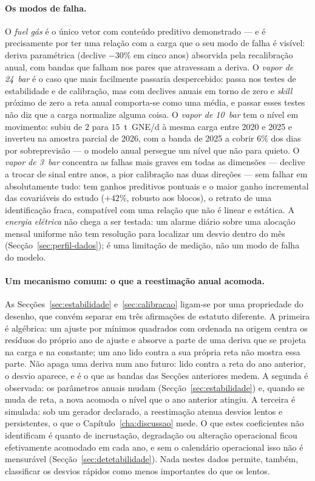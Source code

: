\paragraph{Os modos de falha.} O \emph{fuel gás} é o único vetor com
conteúdo preditivo demonstrado --- e é precisamente por ter uma relação com a
carga que o seu modo de falha é visível: deriva paramétrica (declive $-30\%$ em cinco anos)
absorvida pela recalibração anual, com bandas que falham nos pares que
atravessam a deriva. O \emph{vapor de 24~bar} é o caso que mais facilmente
passaria despercebido: passa nos testes de estabilidade e de calibração, mas
com declives anuais em torno de zero e \emph{skill} próximo de zero a reta
anual comporta-se como uma média, e passar esses testes não diz que a carga
normalize alguma coisa. O \emph{vapor de 10~bar} tem o nível em
movimento: subiu de $2$ para $15$~t~GNE/d à mesma carga entre 2020 e 2025 e
inverteu na amostra parcial de 2026, com a banda de 2025 a cobrir $6\%$ dos
dias por sobreprevisão --- o modelo anual persegue um nível que não para
quieto. O
\emph{vapor de 3~bar} concentra as falhas mais graves em todas as dimensões
--- declive a trocar de sinal entre anos, a pior calibração nas duas direções
--- sem falhar em absolutamente tudo: tem ganhos preditivos pontuais e o maior
ganho incremental das covariáveis do estudo ($+42\%$, robusto aos blocos), o retrato de uma
identificação fraca, compatível com uma relação que não é linear e estática.
A \emph{energia elétrica} não chega a ser testada: um alarme diário sobre uma
alocação mensal uniforme não tem resolução para localizar um desvio dentro
do mês (Secção~\ref{sec:perfil-dados}); é uma limitação de medição, não um
modo de falha do modelo.

\paragraph{Um mecanismo comum: o que a reestimação anual acomoda.} As
Secções~\ref{sec:estabilidade} e~\ref{sec:calibracao} ligam-se por uma
propriedade do desenho, que convém separar em três afirmações de estatuto
diferente. A primeira é algébrica: um ajuste por mínimos quadrados com
ordenada na origem centra os resíduos do próprio ano de ajuste e absorve a
parte de uma deriva que se projeta na carga e na constante; um ano lido
contra a sua própria reta não mostra essa parte. Não apaga uma deriva num
ano futuro: lido contra a reta do ano anterior, o desvio aparece, e é o que
as bandas das Secções anteriores medem. A segunda é observada: os
parâmetros anuais mudam (Secção~\ref{sec:estabilidade}) e, quando se muda de
reta, a nova acomoda o nível que o ano anterior atingiu. A terceira é
simulada: sob um gerador declarado, a reestimação atenua desvios lentos e
persistentes, o que o Capítulo~\ref{cha:discussao} mede. O que estes
coeficientes não identificam é quanto de incrustação, degradação ou
alteração operacional ficou efetivamente acomodado em cada ano, e sem o
calendário operacional isso não é mensurável
(Secção~\ref{sec:detetabilidade}). Nada nestes dados permite, também,
classificar os desvios rápidos como menos importantes do que os lentos.

